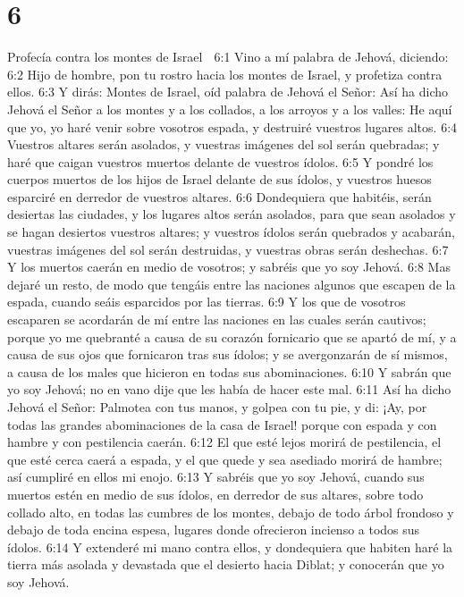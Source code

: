 \chapter{6}

Profecía contra los montes de Israel  

6:1 Vino a mí palabra de Jehová, diciendo:  
6:2 Hijo de hombre, pon tu rostro hacia los montes de Israel, y profetiza contra ellos.  
6:3 Y dirás: Montes de Israel, oíd palabra de Jehová el Señor: Así ha dicho Jehová el Señor a los montes y a los collados, a los arroyos y a los valles: He aquí que yo, yo haré venir sobre vosotros espada, y destruiré vuestros lugares altos.  
6:4 Vuestros altares serán asolados, y vuestras imágenes del sol serán quebradas; y haré que caigan vuestros muertos delante de vuestros ídolos.  
6:5 Y pondré los cuerpos muertos de los hijos de Israel delante de sus ídolos, y vuestros huesos esparciré en derredor de vuestros altares.  
6:6 Dondequiera que habitéis, serán desiertas las ciudades, y los lugares altos serán asolados, para que sean asolados y se hagan desiertos vuestros altares; y vuestros ídolos serán quebrados y acabarán, vuestras imágenes del sol serán destruidas, y vuestras obras serán deshechas.  
6:7 Y los muertos caerán en medio de vosotros; y sabréis que yo soy Jehová.  
6:8 Mas dejaré un resto, de modo que tengáis entre las naciones algunos que escapen de la espada, cuando seáis esparcidos por las tierras.  
6:9 Y los que de vosotros escaparen se acordarán de mí entre las naciones en las cuales serán cautivos; porque yo me quebranté a causa de su corazón fornicario que se apartó de mí, y a causa de sus ojos que fornicaron tras sus ídolos; y se avergonzarán de sí mismos, a causa de los males que hicieron en todas sus abominaciones.  
6:10 Y sabrán que yo soy Jehová; no en vano dije que les había de hacer este mal.  
6:11 Así ha dicho Jehová el Señor: Palmotea con tus manos, y golpea con tu pie, y di: ¡Ay, por todas las grandes abominaciones de la casa de Israel! porque con espada y con hambre y con pestilencia caerán.  
6:12 El que esté lejos morirá de pestilencia, el que esté cerca caerá a espada, y el que quede y sea asediado morirá de hambre; así cumpliré en ellos mi enojo.  
6:13 Y sabréis que yo soy Jehová, cuando sus muertos estén en medio de sus ídolos, en derredor de sus altares, sobre todo collado alto, en todas las cumbres de los montes, debajo de todo árbol frondoso y debajo de toda encina espesa, lugares donde ofrecieron incienso a todos sus ídolos.  
6:14 Y extenderé mi mano contra ellos, y dondequiera que habiten haré la tierra más asolada y devastada que el desierto hacia Diblat; y conocerán que yo soy Jehová.  

